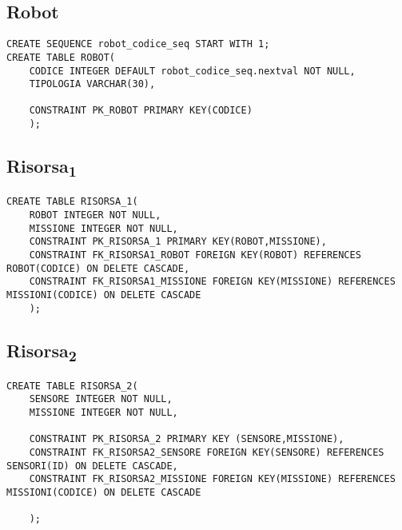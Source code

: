 \begin{description}
\subsection{Robot}
\begin{verbatim}
CREATE SEQUENCE robot_codice_seq START WITH 1;
CREATE TABLE ROBOT(
    CODICE INTEGER DEFAULT robot_codice_seq.nextval NOT NULL,
    TIPOLOGIA VARCHAR(30),
    
    CONSTRAINT PK_ROBOT PRIMARY KEY(CODICE)
    );
\end{verbatim}

\subsection{Risorsa\textsubscript{1}}
\begin{verbatim}
CREATE TABLE RISORSA_1(
    ROBOT INTEGER NOT NULL,
    MISSIONE INTEGER NOT NULL,
    CONSTRAINT PK_RISORSA_1 PRIMARY KEY(ROBOT,MISSIONE),
    CONSTRAINT FK_RISORSA1_ROBOT FOREIGN KEY(ROBOT) REFERENCES ROBOT(CODICE) ON DELETE CASCADE, 
    CONSTRAINT FK_RISORSA1_MISSIONE FOREIGN KEY(MISSIONE) REFERENCES MISSIONI(CODICE) ON DELETE CASCADE
    );
\end{verbatim}

\subsection{Risorsa\textsubscript{2}}
\begin{verbatim}
CREATE TABLE RISORSA_2(
    SENSORE INTEGER NOT NULL,
    MISSIONE INTEGER NOT NULL,
    
    CONSTRAINT PK_RISORSA_2 PRIMARY KEY (SENSORE,MISSIONE),
    CONSTRAINT FK_RISORSA2_SENSORE FOREIGN KEY(SENSORE) REFERENCES SENSORI(ID) ON DELETE CASCADE,
    CONSTRAINT FK_RISORSA2_MISSIONE FOREIGN KEY(MISSIONE) REFERENCES MISSIONI(CODICE) ON DELETE CASCADE
    
    );
\end{verbatim}
\end{description}


